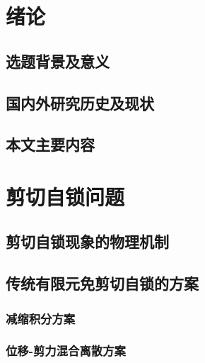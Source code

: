 \documentclass[internationalmaster]{hquThesis}
\begin{document}
\makecover

% 
% 

\frontmatter{
    
    \tableofcontents
}

\mainmatter
\chapter{绪论}
\section{选题背景及意义}


\section{国内外研究历史及现状}


\section{本文主要内容}


\chapter{剪切自锁问题}

\section{剪切自锁现象的物理机制}


\section{传统有限元免剪切自锁的方案}

\subsection{减缩积分方案}


\subsection{位移-剪力混合离散方案}
\end{document}
